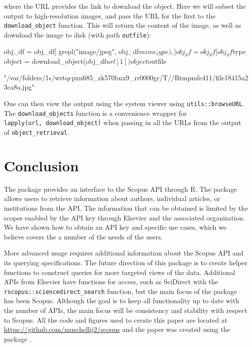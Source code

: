 where the URL provides the link to download the object. Here we will
subset the output to high-resolution images, and pass the URL for the
first to the \texttt{download\_object} function. This will return the
content of the image, as well as download the image to disk (with path
\texttt{outfile}):

\begin{Schunk}
\begin{Sinput}
obj_df = obj_df[ grepl("image/jpeg", obj_df$mime_type),]
obj_df = obj_df[ obj_df$type %
object = download_object(obj_df$url[1])
object$outfile
\end{Sinput}
\begin{Soutput}
[1] "/var/folders/1s/wrtqcpxn685_zk570bnx9_rr0000gr/T//Rtmpmfe411/file18415a23ca8a.jpg"
\end{Soutput}
\end{Schunk}

One can then view the output using the system viewer using
\texttt{utils::browseURL}. The \texttt{download\_objects} function is a
convenience wrapper for \texttt{lapply(url,\ download\_object)} when
passing in all the URLs from the output of \texttt{object\_retrieval}.

\hypertarget{conclusion}{%
\section{Conclusion}\label{conclusion}}

The  package provides an interface to the Scopus API
through R. The package allows users to retrieve information about
authors, individual articles, or institutions from the API. The
information that can be obtained is limited by the scopes enabled by the
API key through Elsevier and the associated organization. We have shown
how to obtain an API key and specific use cases, which we believe covers
the a number of the needs of the users.

More advanced usage requires additional information about the Scopus API
and its querying specifications. The future direction of this package is
to create helper functions to construct queries for more targeted views
of the data. Additional APIs from Elsevier have functions for access,
such as SciDirect with the \texttt{rscopus::sciencedirect\_search}
function, but the main focus of the package has been Scopus. Although
the goal is to keep all functionality up to date with the number of
APIs, the main focus will be consistency and stability with respect to
Scopus. All the code and figures used to create this paper are located
at \url{https://github.com/muschellij2/scopus} and the paper was created
using the  package \citep{rticles}.

